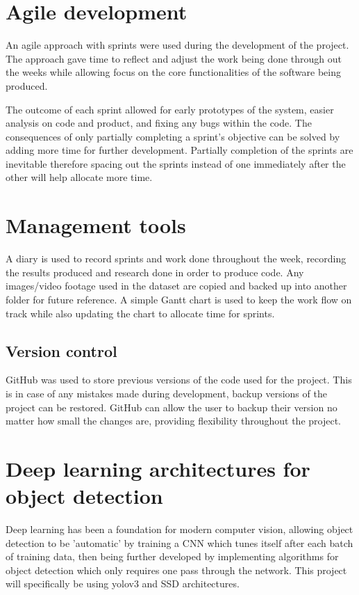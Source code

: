 \documentclass[12pt]{report}
\begin{document}
\section{Agile development}

An agile approach with sprints were used during the development of the project. The approach gave time to reflect and adjust the work being done through out the weeks while allowing focus on the core functionalities of the software being produced. 

The outcome of each sprint allowed for early prototypes of the system, easier analysis on code and product, and fixing any bugs within the code. The consequences of only partially completing a sprint's objective can be solved by adding more time for further development. Partially completion of the sprints are inevitable therefore spacing out the sprints instead of one immediately after the other will help allocate more time. 

\section{Management tools}

A diary is used to record sprints and work done throughout the week, recording the results produced and research done in order to produce code. Any images/video footage used in the dataset are copied and backed up into another folder for future reference. A simple Gantt chart is used to keep the work flow on track while also updating the chart to allocate time for sprints.

\subsection{Version control}

GitHub was used to store previous versions of the code used for the project. This is in case of any mistakes made during development, backup versions of the project can be restored. GitHub can allow the user to backup their version no matter how small the changes are, providing flexibility throughout the project. 


\section{Deep learning architectures for object detection}

Deep learning has been a foundation for modern computer vision, allowing object detection to be 'automatic' by training a CNN which tunes itself after each batch of training data, then being further developed by implementing algorithms for object detection which only requires one pass through the network. This project will specifically be using yolov3 and SSD architectures.
\end{document}

